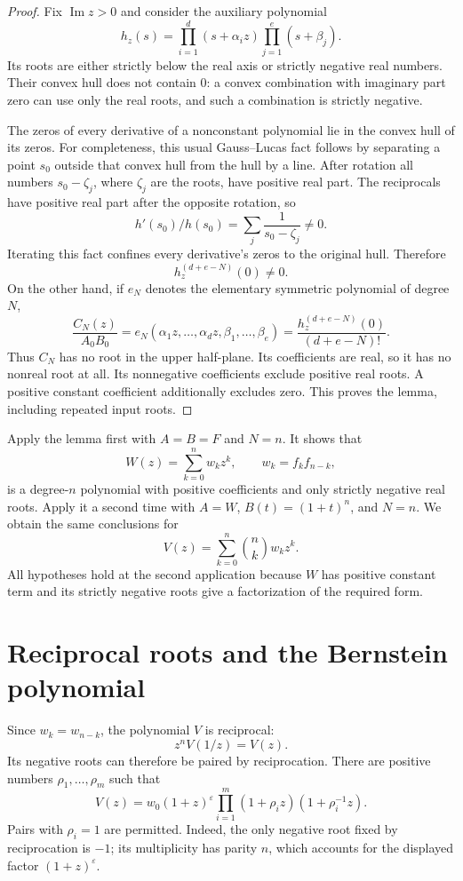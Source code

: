 \documentclass[11pt,a4paper]{article}
\begin{document}
\begin{proof} Fix $\operatorname{Im}z>0$ and consider the auxiliary polynomial
\[
 h_z(s)=\prod_{i=1}^d(s+\alpha_i z)\prod_{j=1}^e(s+\beta_j).
\]
Its roots are either strictly below the real axis or strictly negative real numbers. Their convex hull does not contain $0$: a convex combination with imaginary part zero can use only the real roots, and such a combination is strictly negative.

The zeros of every derivative of a nonconstant polynomial lie in the convex hull of its zeros. For completeness, this usual Gauss--Lucas fact follows by separating a point $s_0$ outside that convex hull from the hull by a line. After rotation all numbers $s_0-\zeta_j$, where $\zeta_j$ are the roots, have positive real part. The reciprocals have positive real part after the opposite rotation, so
\[
 h'(s_0)/h(s_0)=\sum_j\frac1{s_0-\zeta_j}\ne0.
\]
Iterating this fact confines every derivative's zeros to the original hull. Therefore
\[
 h_z^{(d+e-N)}(0)\ne0.
\]
On the other hand, if $e_N$ denotes the elementary symmetric polynomial of degree $N$,
\[
 \frac{C_N(z)}{A_0B_0}
 =e_N(\alpha_1z,\ldots,\alpha_dz,\beta_1,\ldots,\beta_e)
 =\frac{h_z^{(d+e-N)}(0)}{(d+e-N)!}.
\]
Thus $C_N$ has no root in the upper half-plane. Its coefficients are real, so it has no nonreal root at all. Its nonnegative coefficients exclude positive real roots. A positive constant coefficient additionally excludes zero. This proves the lemma, including repeated input roots. \end{proof}

Apply the lemma first with \(A=B=F\) and \(N=n\). It shows that \[
 W(z)=\sum_{k=0}^n w_kz^k,\qquad w_k=f_kf_{n-k}, \tag{3}
\] is a degree-\(n\) polynomial with positive coefficients and only strictly negative real roots. Apply it a second time with \(A=W\), \(B(t)=(1+t)^n\), and \(N=n\). We obtain the same conclusions for \[
 V(z)=\sum_{k=0}^n\binom nk w_kz^k. \tag{4}
\] All hypotheses hold at the second application because \(W\) has positive constant term and its strictly negative roots give a factorization of the required form.

\section{Reciprocal roots and the Bernstein polynomial}\label{sec:bernstein}

Since \(w_k=w_{n-k}\), the polynomial \(V\) is reciprocal: \[
 z^nV(1/z)=V(z).
\] Its negative roots can therefore be paired by reciprocation. There are positive numbers \(\rho_1,\ldots,\rho_m\) such that \[
 V(z)=w_0(1+z)^\varepsilon
       \prod_{i=1}^m(1+\rho_i z)(1+\rho_i^{-1}z). \tag{5}
\] Pairs with \(\rho_i=1\) are permitted. Indeed, the only negative root fixed by reciprocation is \(-1\); its multiplicity has parity \(n\), which accounts for the displayed factor \((1+z)^\varepsilon\).
\end{document}
